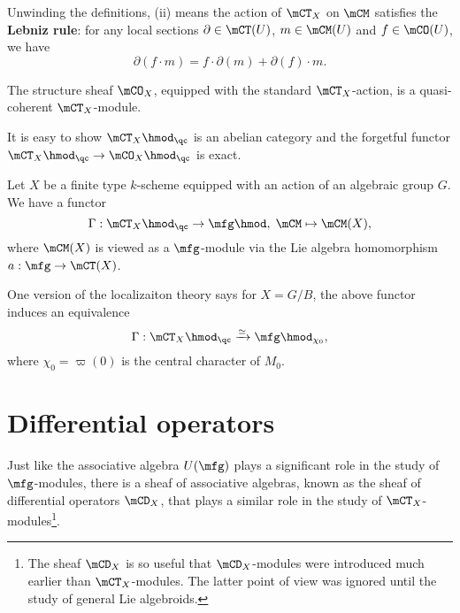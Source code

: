 	\begin{rem}
		Unwinding the definitions, (ii) means the action of $\mCT_X$ on $\mCM$ satisfies the \textbf{Lebniz rule}: for any local sections $\partial\in \mCT(U)$, $m\in \mCM(U)$ and $f\in \mCO(U)$, we have
		\[
			\partial( f\cdot m ) = f\cdot \partial(m)+\partial(f)\cdot m.
		\]
	\end{rem}

	\begin{exam}
		The structure sheaf $\mCO_X$, equipped with the standard $\mCT_X$-action, is a quasi-coherent $\mCT_X$-module.
	\end{exam}

	\begin{rem}
		It is easy to show $\mCT_X\hmod_\qc$ is an abelian category and the forgetful functor $\mCT_X\hmod_\qc \to \mCO_X\hmod_\qc$ is exact.
	\end{rem}


	\begin{constr}
		Let $X$ be a finite type $k$-scheme equipped with an action of an algebraic group $G$. We have a functor
		\[
			\Gamma: \mCT_X\hmod_\qc \to \mfg\hmod,\; \mCM \mapsto \mCM(X),
		\]
		where $\mCM(X)$ is viewed as a $\mfg$-module via the Lie algebra homomorphism $a:\mfg \to \mCT(X)$.
	\end{constr}

	\begin{rem}
		One version of the localizaiton theory says for $X=G/B$, the above functor induces an equivalence
		\[
			\Gamma: \mCT_X\hmod_\qc \xrightarrow{\simeq} \mfg\hmod_{\chi_0},
		\]
		where $\chi_0=\varpi(0)$ is the central character of $M_0$.
	\end{rem}

\section{Differential operators}

	Just like the associative algebra $U(\mfg)$ plays a significant role in the study of $\mfg$-modules, there is a sheaf of associative algebras, known as the sheaf of differential operators $\mCD_X$, that plays a similar role in the study of $\mCT_X$-modules\footnote{The sheaf $\mCD_X$ is so useful that $\mCD_X$-modules were introduced much earlier than $\mCT_X$-modules. The latter point of view was ignored until the study of general Lie algebroids.}.


